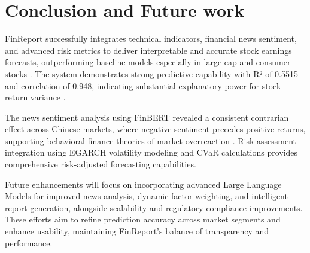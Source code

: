 \documentclass[3p,times,procedia]{elsarticle}
\begin{document}
\section{Conclusion and Future work}
FinReport successfully integrates technical indicators, financial news sentiment, and advanced risk metrics to deliver interpretable and accurate stock earnings forecasts, outperforming baseline models especially in large-cap and consumer stocks \cite{Fischer2018, Bao2017}. The system demonstrates strong predictive capability with R² of 0.5515 and correlation of 0.948, indicating substantial explanatory power for stock return variance \cite{Sezer2020}. 

The news sentiment analysis using FinBERT \cite{Araci2019} revealed a consistent contrarian effect across Chinese markets, where negative sentiment precedes positive returns, supporting behavioral finance theories of market overreaction \cite{TETLOCK2007}. Risk assessment integration using EGARCH volatility modeling \cite{Nelson1991} and CVaR calculations \cite{Rockafellar2000} provides comprehensive risk-adjusted forecasting capabilities.

Future enhancements will focus on incorporating advanced Large Language Models \cite{Devlin2019} for improved news analysis, dynamic factor weighting, and intelligent report generation, alongside scalability and regulatory compliance improvements. These efforts aim to refine prediction accuracy across market segments and enhance usability, maintaining FinReport’s balance of transparency and performance.
\end{document}
